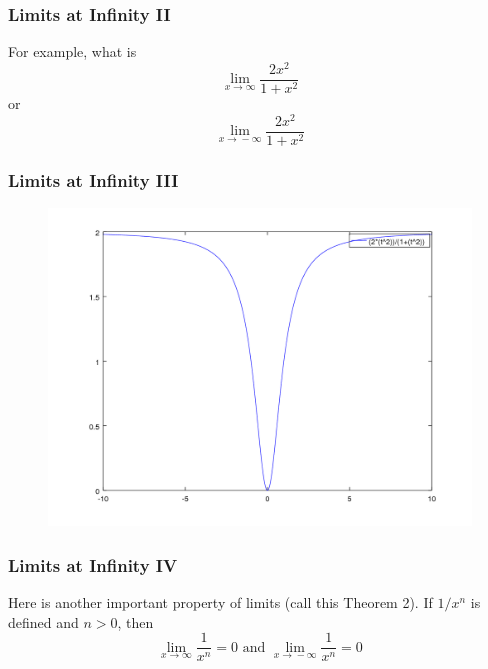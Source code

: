 \documentclass[xcolor=dvipsnames]{beamer}
\begin{document}
\begin{frame}
  \frametitle{Limits at Infinity II}
For example, what is
\begin{equation}
  \label{eq:wingeisa}
  \lim_{x\rightarrow\infty}\frac{2x^{2}}{1+x^{2}}
\end{equation}
or
\begin{equation}
  \label{eq:ahxaibah}
  \lim_{x\rightarrow{}-\infty}\frac{2x^{2}}{1+x^{2}}
\end{equation}
\end{frame}

\begin{frame}
  \frametitle{Limits at Infinity III}
  \begin{figure}[h]
    \includegraphics[scale=.5]{./lai.png}
  \end{figure}
\end{frame}

\begin{frame}
  \frametitle{Limits at Infinity IV}
Here is another important property of limits (call this \alert{Theorem
2}). If $1/x^{n}$ is defined and $n>0$, then
\begin{equation}
  \label{eq:faingiej}
  \lim_{x\rightarrow{}\infty}\frac{1}{x^{n}}=0\mbox{ and }\lim_{x\rightarrow{}-\infty}\frac{1}{x^{n}}=0
\end{equation}
\end{frame}
\end{document}
